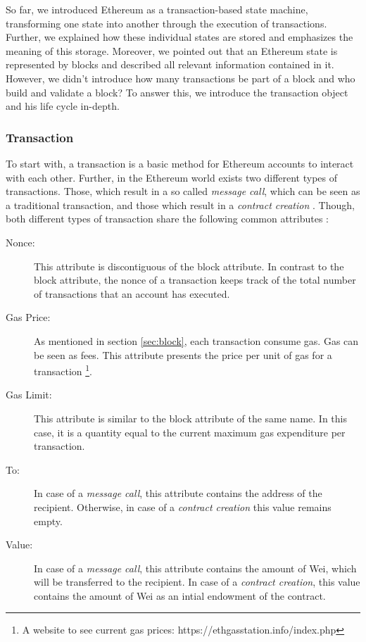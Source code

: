 So far, we introduced Ethereum as a transaction-based state machine, transforming 
one state into another through the execution of transactions. Further, we explained 
how these individual states are stored and emphasizes the meaning of this storage. 
Moreover, we pointed out that an Ethereum state is represented by blocks and described 
all relevant information contained in it.
However, we didn't introduce how many transactions be part 
of a block and who build and validate a block? To answer this, 
we introduce the transaction object and his life cycle in-depth.


\subsubsection{Transaction}
\label{sec:transaction}
To start with, a transaction is a basic method for Ethereum accounts to interact with each other. 
Further, in the Ethereum world exists two different types of transactions. 
Those, which result in a so called \textit{message call}, which can be seen as a 
traditional transaction, and those which result in a \textit{contract creation} . 
Though, both different types of transaction share the following common attributes :

\begin{description}
	\item[Nonce: ] This attribute is discontiguous of the block attribute. In contrast to the block attribute, the nonce of a transaction keeps track of the total number of transactions that an account has executed. 
	\item[Gas Price: ] As mentioned in section \ref{sec:block}, each transaction consume gas. Gas can be seen as fees. This attribute presents the price per unit of gas for a transaction \footnote{A website to see current gas prices: https://ethgasstation.info/index.php}. 
	\item[Gas Limit: ] This attribute is similar to the block attribute of the same name. In this case, it is a quantity equal to the current maximum gas expenditure per transaction.  
	\item[To: ] In case of a \textit{message call}, this attribute contains the address of the recipient. Otherwise, in case of a \textit{contract creation} this value remains empty. 
	\item[Value: ] In case of a \textit{message call}, this attribute contains the amount of Wei, which will be transferred to the recipient. In case of a \textit{contract creation}, this value contains the amount of Wei as an intial endowment of the contract.
\end{description}

